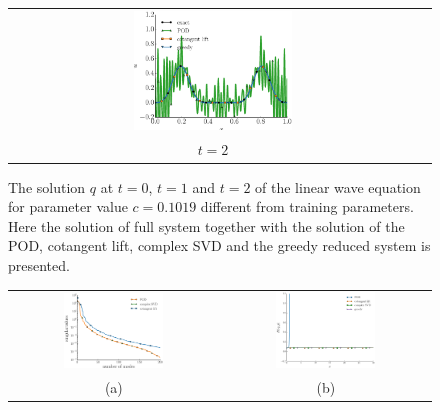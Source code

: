 \begin{figure}[t]
\centering
\begin{tabular}{cc}
\includegraphics[width=0.4\textwidth]{./figs/wave/solution/solution_t2} \\
	$t=2$
\end{tabular}
\caption{The solution $q$ at $t=0$, $t=1$ and $t=2$ of the linear wave equation for parameter value $c= 0.1019$ different from training parameters. Here the solution of full system together with the solution of the POD, cotangent lift, complex SVD and the greedy reduced system is presented.}\label{fig:NuRe:3}
\end{figure}



\begin{figure}[t]
\begin{center}
\begin{tabular}{cc}
	\includegraphics[width=0.5\textwidth]{./figs/wave/singular} &
	\includegraphics[width=0.5\textwidth]{./figs/wave/hamiltonian} \\
	(a) & (b)
\end{tabular}
\end{center}
\end{figure}

